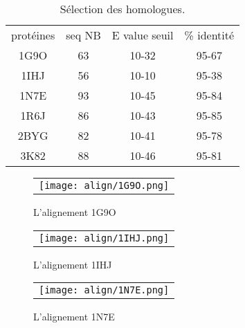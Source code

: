    \begin{table}[!htbp]
      \centering

      \begin{tabular}{cccc}

        \toprule
        protéines & seq NB & E value seuil & \% identité \\
        \cmidrule{1-4}
     1G9O  & 63  &    10-32  &  95-67 \\
     1IHJ  & 56  &    10-10  &  95-38 \\
     1N7E  & 93  &    10-45  &  95-84 \\
     1R6J  & 86  &    10-43  &  95-85 \\
     2BYG  & 82  &    10-41  &  95-78 \\
     3K82  & 88  &    10-46  &  95-81 \\


        \bottomrule


      \end{tabular}      
      \caption{Sélection des homologues.}
\label{tab:freq_AA_ALL}      
    \end{table}


    \clearpage

   \begin{figure}[t]
     \centering
     \begin{tabular}{c}
       \texttt{[image: align/1G9O.png]} \\
     \end{tabular}
     \caption{L'alignement 1G9O }
\label{graph:convEref}
   \end{figure}

    \clearpage

   \begin{figure}[t]
     \centering
     \begin{tabular}{c}
       \texttt{[image: align/1IHJ.png]} \\
     \end{tabular}
     \caption{L'alignement 1IHJ }
\label{graph:convEref}
   \end{figure}

    \clearpage

   \begin{figure}[t]
     \centering
     \begin{tabular}{c}
       \texttt{[image: align/1N7E.png]} \\
     \end{tabular}
     \caption{L'alignement 1N7E }
\label{graph:convEref}
   \end{figure}

